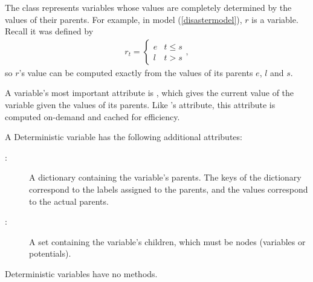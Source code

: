 \documentclass[]{jss}
\begin{document}
The  class represents variables whose values are completely determined by the values of their parents. For example, in model (\ref{disastermodel}), $r$ is a  variable. Recall it was defined by
\begin{eqnarray*}
    r_t=\left\{\begin{array}{ll}
        e & t\le s\\ l & t>s
        \end{array}\right.,
\end{eqnarray*}
so $r$'s value can be computed exactly from the values of its parents $e$, $l$ and $s$.

A  variable's most important attribute is , which gives the current value of the variable given the values of its parents. Like 's  attribute, this attribute is computed on-demand and cached for efficiency.

A Deterministic variable has the following additional attributes:
\begin{description}
    \item[:] A dictionary containing the variable's parents. The keys of the dictionary correspond to the labels assigned to the parents, and the values correspond to the actual parents.
    \item[:] A set containing the variable's children, which must be nodes (variables or potentials).
\end{description}
Deterministic variables have no methods.
\end{document}
